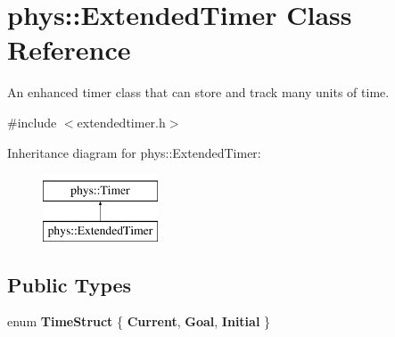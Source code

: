 \hypertarget{classphys_1_1ExtendedTimer}{
\section{phys::ExtendedTimer Class Reference}
\label{dc/d7c/classphys_1_1ExtendedTimer}
}


An enhanced timer class that can store and track many units of time.  




{\ttfamily \#include $<$extendedtimer.h$>$}

Inheritance diagram for phys::ExtendedTimer:\begin{figure}[H]
\begin{center}
\leavevmode
\includegraphics[height=2.000000cm]{dc/d7c/classphys_1_1ExtendedTimer}
\end{center}
\end{figure}
\subsection*{Public Types}
\begin{DoxyCompactItemize}
\item 
enum {\bfseries TimeStruct} \{ {\bfseries Current}, 
{\bfseries Goal}, 
{\bfseries Initial}
 \}
\end{DoxyCompactItemize}
